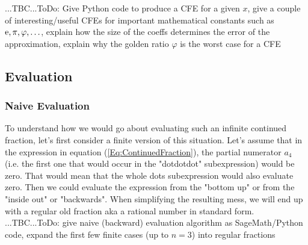 ...TBC...ToDo: Give Python code to produce a CFE for a given $x$, give a couple of interesting/useful CFEs for important mathematical constants such as $\operatorname{\mathrm{e}}, \pi, \varphi, \ldots$, explain how the size of the coeffs determines the error of the approximation, explain why the golden ratio $\varphi$ is the worst case for a CFE






\subsection{Evaluation}

\subsubsection{Naive Evaluation}
To understand how we would go about evaluating such an infinite continued fraction, let's first consider a finite version of this situation. Let's assume that in the expression in equation (\ref{Eq:ContinuedFraction}), the partial numerator $a_4$ (i.e. the first one that would occur in the "dotdotdot" subexpression) would be zero. That would mean that the whole dots subexpression would also evaluate zero. Then we could evaluate the expression from the "bottom up" or from the "inside out" or "backwards". When simplifying the resulting mess, we will end up with a regular old fraction aka a rational number in standard form. ...TBC...ToDo: give naive (backward) evaluation algorithm as SageMath/Python code, expand the first few finite cases (up to $n=3$) into regular fractions



